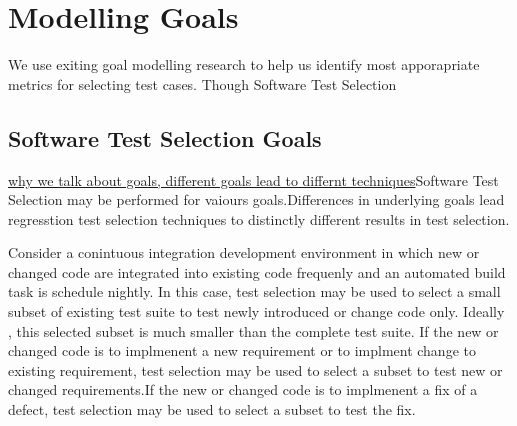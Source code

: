 %
%


\reversemarginpar
\setlength{\marginparwidth}{2cm}
\chapter{Modelling Goals}
We use exiting goal modelling research to help us identify most apporapriate
metrics for selecting test cases. Though Software Test Selection 
\newpage
\section{Software Test Selection Goals}

\underline{why we talk about goals, different goals lead to differnt
techniques}Software Test Selection may be
performed for vaiours goals.Differences in underlying goals lead regresstion test selection
techniques to distinctly different results in test selection\cite{DBLP:journals/tse/RothermelH96}. 

Consider a conintuous integration development environment in which new or
changed code are integrated into existing code frequenly and an automated build
task is schedule nightly. In this case, test selection may be used to select a
small subset of existing test suite to test newly introduced or change code
only. Ideally , this selected subset is much smaller than the complete test
suite. If the new or changed code is to implmenent a new requirement or to
implment change to existing requirement, test selection may be used to select a
subset to test new or changed requirements.If the new or changed code is to
implmenent a fix of a defect, test selection may be used to select a subset to
test the fix. 

